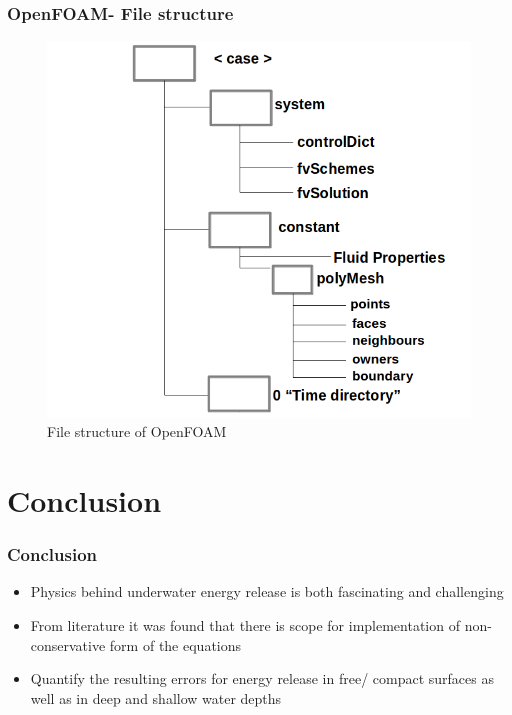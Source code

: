 \documentclass{beamer}
\begin{document}

\begin{frame}
\frametitle{OpenFOAM- File structure}
\begin{figure}[h]  
\begin{center}  
\includegraphics[scale=0.3]{8.png}
\caption{\tiny File structure of OpenFOAM }
\end{center}  
\end{figure}

\end{frame}

\section{Conclusion}
\begin{frame}
\frametitle{Conclusion}
\begin{itemize}
  \item Physics behind underwater energy release is both fascinating and challenging
  \item From literature it was found that there is scope for implementation of non-conservative form of the equations
  \item Quantify the resulting errors for energy release in free/ compact surfaces as well as in deep and shallow water depths
\end{itemize}
\end{frame}
\end{document}
